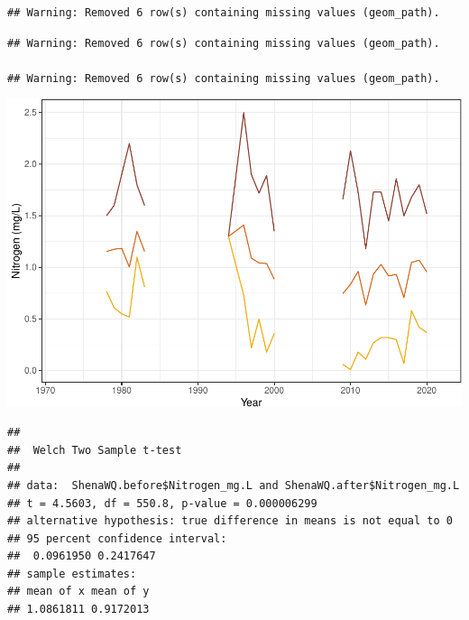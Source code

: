 \documentclass[
  12pt,
]{article}
\newenvironment{Shaded}{\begin{snugshade}}{\end{snugshade}}
\newcommand{\AttributeTok}[1]{\textcolor[rgb]{0.77,0.63,0.00}{#1}}
\newcommand{\CommentTok}[1]{\textcolor[rgb]{0.56,0.35,0.01}{\textit{#1}}}
\newcommand{\ConstantTok}[1]{\textcolor[rgb]{0.00,0.00,0.00}{#1}}
\newcommand{\FunctionTok}[1]{\textcolor[rgb]{0.00,0.00,0.00}{#1}}
\newcommand{\NormalTok}[1]{#1}
\newcommand{\OtherTok}[1]{\textcolor[rgb]{0.56,0.35,0.01}{#1}}
\newcommand{\SpecialCharTok}[1]{\textcolor[rgb]{0.00,0.00,0.00}{#1}}
\begin{document}
\begin{verbatim}
## Warning: Removed 6 row(s) containing missing values (geom_path).
\end{verbatim}

\begin{verbatim}
## Warning: Removed 6 row(s) containing missing values (geom_path).

## Warning: Removed 6 row(s) containing missing values (geom_path).
\end{verbatim}

\includegraphics{Project_Template_files/figure-latex/Nitrogen_Analysis-2.pdf}

\begin{Shaded}
\end{Shaded}

\begin{verbatim}
## 
##  Welch Two Sample t-test
## 
## data:  ShenaWQ.before$Nitrogen_mg.L and ShenaWQ.after$Nitrogen_mg.L
## t = 4.5603, df = 550.8, p-value = 0.000006299
## alternative hypothesis: true difference in means is not equal to 0
## 95 percent confidence interval:
##  0.0961950 0.2417647
## sample estimates:
## mean of x mean of y 
## 1.0861811 0.9172013
\end{verbatim}
\end{document}
